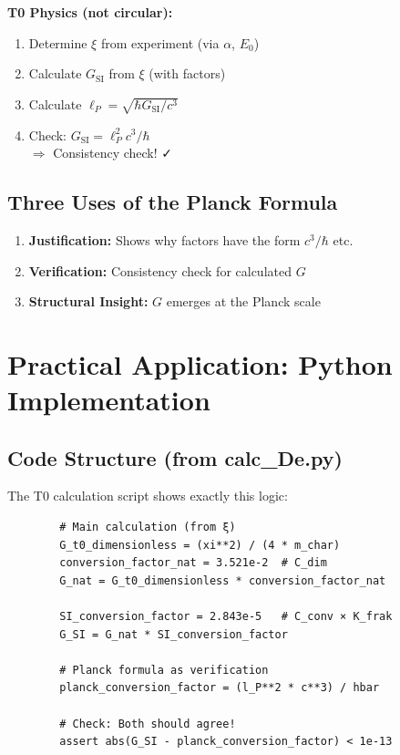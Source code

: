 	\textbf{T0 Physics (not circular):}
	\begin{enumerate}
		\item Determine $\xi$ from experiment (via $\alpha$, $E_0$)
		\item Calculate $G_{\text{SI}}$ from $\xi$ (with factors)
		\item Calculate $\ell_P = \sqrt{\hbar G_{\text{SI}} / c^3}$
		\item Check: $G_{\text{SI}} = \ell_P^2 c^3 / \hbar$ \\
		$\Rightarrow$ Consistency check! ✓
	\end{enumerate}
	
	\subsection{Three Uses of the Planck Formula}
	
	\begin{enumerate}
		\item \textbf{Justification:} Shows why factors have the form $c^3/\hbar$ etc.
		
		\item \textbf{Verification:} Consistency check for calculated $G$
		
		\item \textbf{Structural Insight:} $G$ emerges at the Planck scale
	\end{enumerate}
	
	\section{Practical Application: Python Implementation}
	
	\subsection{Code Structure (from calc\_De.py)}
	
	The T0 calculation script shows exactly this logic:
	
	\begin{verbatim}
		# Main calculation (from ξ)
		G_t0_dimensionless = (xi**2) / (4 * m_char)
		conversion_factor_nat = 3.521e-2  # C_dim
		G_nat = G_t0_dimensionless * conversion_factor_nat
		
		SI_conversion_factor = 2.843e-5   # C_conv × K_frak
		G_SI = G_nat * SI_conversion_factor
		
		# Planck formula as verification
		planck_conversion_factor = (l_P**2 * c**3) / hbar
		
		# Check: Both should agree!
		assert abs(G_SI - planck_conversion_factor) < 1e-13
	\end{verbatim}
	
